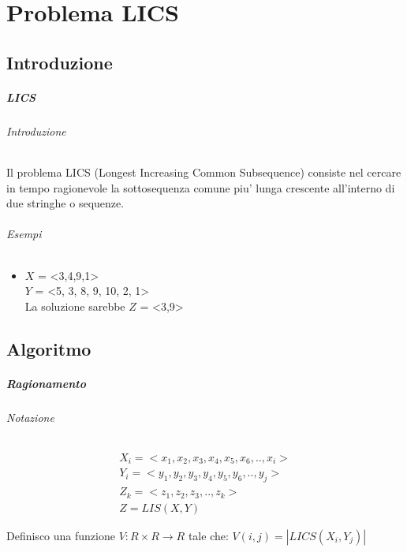 \chapter{Problema LICS}

\section{Introduzione}

\paragraph{LICS}

\subparagraph{Introduzione}

Il problema LICS (Longest Increasing Common Subsequence) consiste nel cercare in tempo ragionevole la sottosequenza comune piu' lunga crescente all'interno di due stringhe o sequenze.

\subparagraph{Esempi}

\begin{itemize}

\item

$X$ = <3,4,9,1> \\
$Y$ = <5, 3, 8, 9, 10, 2, 1> \\

La soluzione sarebbe $Z$ = <3,9>

\end{itemize}

\section{Algoritmo}

\paragraph{Ragionamento}

\subparagraph{Notazione}

\begin{align}
    \text{$X_i = <x_1, x_2, x_3, x_4, x_5, x_6, .., x_i>$} \\
    \text{$Y_i = <y_1, y_2, y_3, y_4, y_5, y_6, .., y_j>$} \\
    \text{$Z_k = <z_1, z_2, z_3, .., z_k>$} \\
    \text{$Z = LIS(X, Y)$}
\end{align}

Definisco una funzione $V : R \times R \rightarrow R$ tale che: $V(i, j) = |LICS(X_i, Y_j)|$ \\

